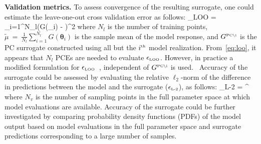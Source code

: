 \textbf{Validation metrics.}
To assess convergence of the resulting surrogate, one could estimate the
leave-one-out cross validation error as follows:
\be
\epsilon_{\mbox{\tiny LOO}} = 
{\sum\limits_{i=1}^{N_l}\left(G(\bm{\theta}_i) - \widetilde{\mu}\right)^2}
\label{eq:loo}
\ee
where $N_l$ is the number of training points, 
$\widetilde{\mu}~=~\frac{1}{N_l}\sum\limits_{i=1}^{N_l} G(\bm{\theta}_i)$
is the sample mean of the model response, and $ G^{\mbox{\tiny
{PC}\textbackslash i}}$ is the PC surrogate constructed using all but the
$i^{\mbox{\tiny{th}}}$ model realization.  From~\eqref{eq:loo}, it appears
that $N_l$ PCEs are needed to evaluate $\epsilon_{\mbox{\tiny LOO}}$.  However,
in practice a modified formulation for $\epsilon_{\mbox{\tiny
LOO}}$~\cite{Blatman:2009}, independent of $G^{\mbox{\tiny {PC}\textbackslash
i}}$ is used.~
Accuracy of the surrogate could be assessed by evaluating the
relative $\ell_2$-norm of the difference in predictions between the model and the
surrogate ($\epsilon_{\mbox{\tiny{L-2}}}$), as follows:
\be
\epsilon_{\mbox{\tiny{L-2}}} = 
{\left[\sum\limits_{i=1}^{N_v}\left(G(\bm{\theta}_i)\right)^2\right]^{}}
\label{eq:l2}
\ee
where $N_v$ is the number of sampling points in the full parameter space at
which model evaluations are available. 
Accuracy of the surrogate could be
further investigated by comparing probability density functions (PDFs) of the
model output based on model evaluations in the full parameter space and
surrogate predictions corresponding to a large number of samples.  

